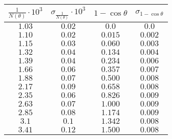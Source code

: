 \begin{tabular}{| c | c | c | c |}
\hline
$\frac{1}{N\left(\theta\right)} \cdot 10^3$ & $\sigma_{\frac{1}{N\left(\theta\right)}} \cdot 10^3$ & $1 - \cos{\theta}$ & $\sigma_{1 - \cos{\theta}}$\\
\hline
$1.03$ & $0.02$ & $0.0$ & $0.0$\\
\hline
$1.10$ & $0.02$ & $0.015$ & $0.002$\\
\hline
$1.15$ & $0.03$ & $0.060$ & $0.003$\\
\hline
$1.32$ & $0.04$ & $0.134$ & $0.004$\\
\hline
$1.39$ & $0.04$ & $0.234$ & $0.006$\\
\hline
$1.66$ & $0.06$ & $0.357$ & $0.007$\\
\hline
$1.88$ & $0.07$ & $0.500$ & $0.008$\\
\hline
$2.17$ & $0.09$ & $0.658$ & $0.008$\\
\hline
$2.35$ & $0.06$ & $0.826$ & $0.009$\\
\hline
$2.63$ & $0.07$ & $1.000$ & $0.009$\\
\hline
$2.85$ & $0.08$ & $1.174$ & $0.009$\\
\hline
$3.1$ & $0.1$ & $1.342$ & $0.008$\\
\hline
$3.41$ & $0.12$ & $1.500$ & $0.008$\\
\hline
\end{tabular}
